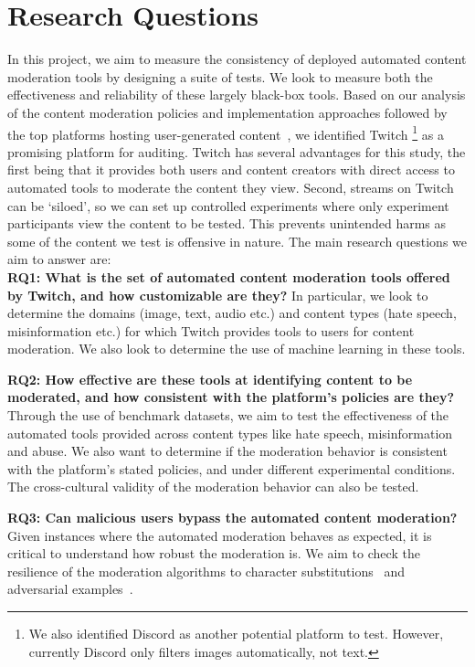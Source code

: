\documentclass{article}
\begin{document}
\section*{Research Questions}
In this project, we aim to measure the consistency of deployed automated content
moderation tools by designing a suite of tests. We look to measure both the
effectiveness and reliability of these largely black-box tools. Based on our
analysis of the content moderation policies and implementation approaches
followed by the top platforms hosting user-generated
content~\cite{schaffner2024community}, we identified Twitch \footnote{We also
identified Discord as another potential platform to test. However, currently
Discord only filters images automatically, not text.} as a promising platform
for auditing. Twitch has several advantages for this study, the first being that
it provides both users and content creators with direct access to automated
tools to moderate the content they view. Second, streams on Twitch can be
`siloed', so we can set up controlled experiments where only experiment
participants view the content to be tested. This prevents unintended harms as
some of the content we test is offensive in nature. The main research questions we aim to answer are: \\
\noindent \textbf{RQ1: What is the set of automated content moderation tools
offered by Twitch, and how customizable are they?} In particular, we look to
determine the domains (image, text, audio etc.) and content types (hate speech,
misinformation etc.) for which Twitch provides tools to users for content
moderation. We also look to determine the use of machine learning in these tools.

\noindent \textbf{RQ2: How effective are these tools at identifying content to
be moderated, and how consistent with the platform's policies are they?} Through
the use of benchmark datasets, we aim to test the effectiveness of the automated
tools provided across content types like hate speech, misinformation and abuse.
We also want to determine if the moderation behavior is consistent with the
platform's stated policies, and under different experimental conditions. The
cross-cultural validity of the moderation behavior can also be tested.

\noindent \textbf{RQ3: Can malicious users bypass the automated content
moderation?} Given instances where the automated moderation behaves as expected,
it is critical to understand how robust the moderation is. We aim to check the
resilience of the moderation algorithms to character
substitutions~\cite{hiruncharoenvate2015algorithmically} and adversarial
examples~\cite{grondahl2018all}. 
\end{document}
